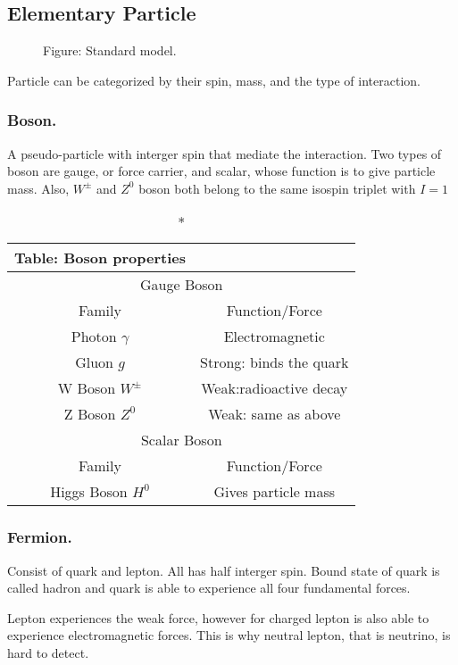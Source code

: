 \documentclass[../../../main.tex]{subfiles}
\begin{document}
\subsection*{Elementary Particle}
\begin{figure*}[b]
    \centering
    \caption*{Figure: Standard model.}
\end{figure*}
Particle can be categorized by their spin, mass, and the type of interaction.

\subsubsection*{Boson.} A pseudo-particle with interger spin that mediate the interaction. Two types of boson are gauge, or force carrier, and scalar, whose function is to give particle mass. Also, $W^{\pm}$ and $Z^0$ boson both belong to the same isospin triplet with $I=1$
\begin{longtable}{cc}
    \caption*{Table: Boson properties}\\
    \toprule
    \multicolumn{2}{c}{Gauge Boson}\\
    \midrule
    Family&Function/Force\\
    \midrule
    Photon $\gamma$&Electromagnetic\\
    Gluon $g$&Strong: binds the quark\\
    W Boson $W^{\pm}$&Weak:radioactive decay\\
    Z Boson $Z^0$&Weak: same as above\\
    \bottomrule
    \toprule
    \multicolumn{2}{c}{Scalar Boson}\\
    \midrule
    Family&Function/Force\\
    \midrule
    Higgs Boson $H^0$&Gives particle mass\\
    \bottomrule
\end{longtable}

\subsubsection*{Fermion.} Consist of quark and lepton. All has half interger spin. Bound state of quark is called hadron and quark is able to experience all four fundamental forces.

Lepton experiences the weak force, however for charged lepton is also able to experience electromagnetic forces. This is why neutral lepton, that is neutrino, is hard to detect.
\end{document}
